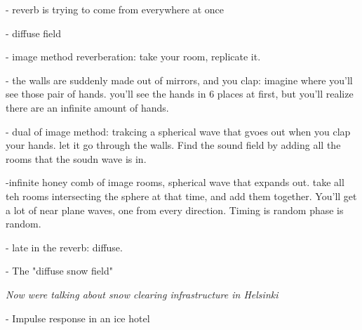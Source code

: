 - reverb is trying to come from everywhere at once

- diffuse field

- image method reverberation: take your room, replicate it. 

- the walls are suddenly made out of mirrors, and you clap: imagine where you'll see those pair of hands. you'll see the hands in 
6 places at first, but you'll realize there are an infinite amount of hands. 

- dual of image method: trakcing a spherical wave that gvoes out when you clap your hands. let it go through
the walls. Find the sound field by adding all the rooms that the soudn wave is in.

-infinite honey comb of image rooms, spherical wave that expands out. take all teh rooms intersecting the sphere 
at that time, and add them together. You'll get a lot of near plane waves, one from every direction. Timing is random
phase is random.

- late in the reverb: diffuse. 


- The "diffuse snow field"

\textit{Now were talking about snow clearing infrastructure in Helsinki}

- Impulse response in an ice hotel \\
